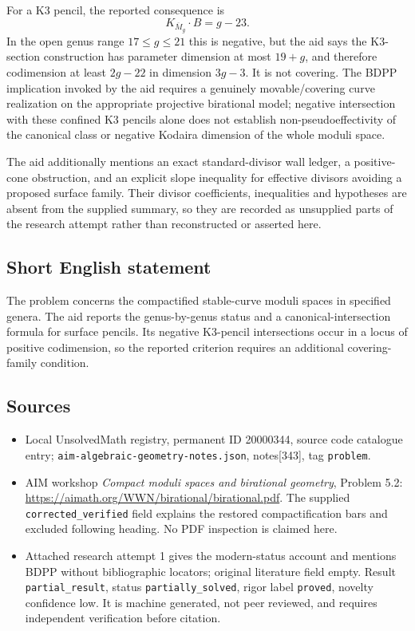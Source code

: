 \documentclass[11pt]{article}
\begin{document}
For a K3 pencil, the reported consequence is
\[K_{\overline M_g}\cdot B=g-23.\]
In the open genus range $17\le g\le21$ this is negative, but the aid says the K3-section construction has parameter dimension at most $19+g$, and therefore codimension at least $2g-22$ in dimension $3g-3$. It is not covering. The BDPP implication invoked by the aid requires a genuinely movable/covering curve realization on the appropriate projective birational model; negative intersection with these confined K3 pencils alone does not establish non-pseudoeffectivity of the canonical class or negative Kodaira dimension of the whole moduli space.

The aid additionally mentions an exact standard-divisor wall ledger, a positive-cone obstruction, and an explicit slope inequality for effective divisors avoiding a proposed surface family. Their divisor coefficients, inequalities and hypotheses are absent from the supplied summary, so they are recorded as unsupplied parts of the research attempt rather than reconstructed or asserted here.
\subsection{Short English statement}
The problem concerns the compactified stable-curve moduli spaces in specified genera. The aid reports the genus-by-genus status and a canonical-intersection formula for surface pencils. Its negative K3-pencil intersections occur in a locus of positive codimension, so the reported criterion requires an additional covering-family condition.
\subsection{Sources}
\begin{itemize}
\item Local UnsolvedMath registry, permanent ID 20000344, source code catalogue entry; \texttt{aim-algebraic-geometry-notes.json}, notes[343], tag \texttt{problem}.
\item AIM workshop \emph{Compact moduli spaces and birational geometry}, Problem 5.2: \url{https://aimath.org/WWN/birational/birational.pdf}. The supplied \texttt{corrected\_verified} field explains the restored compactification bars and excluded following heading. No PDF inspection is claimed here.
\item Attached research attempt 1 gives the modern-status account and mentions BDPP without bibliographic locators; original literature field empty. Result \texttt{partial\_result}, status \texttt{partially\_solved}, rigor label \texttt{proved}, novelty confidence low. It is machine generated, not peer reviewed, and requires independent verification before citation.
\end{itemize}
\end{document}
